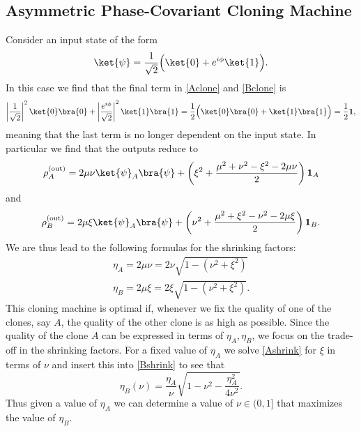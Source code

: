 \documentclass[reqno]{amsart}
\numberwithin{lemma}{section}
\numberwithin{proposition}{section}
\begin{document}
\subsection{Asymmetric Phase-Covariant Cloning Machine}
Consider an input state of the form
\begin{equation*}
    \ket{\psi} = \frac{1}{\sqrt{2}} \Big ( \ket{0} + e^{i\phi} \ket{1} \Big ).
\end{equation*}
In this case we find that the final term in \eqref{Aclone} and \eqref{Bclone} is 
\begin{align*}
    \left \vert \frac{1}{\sqrt{2}} \right \vert^{2} \ket{0} \bra{0} + \left \vert \frac{e^{i\phi}}{\sqrt{2}} \right \vert^{2} \ket{1} \bra{1} = \frac{1}{2} \Big ( \ket{0} \bra{0} + \ket{1} \bra{1} \Big ) = \frac{1}{2} \mathbf{1},
\end{align*}
meaning that the last term is no longer dependent on the input state. In particular we find that the outputs reduce to
\begin{equation}
\label{PCAclone}
    \rho_{A}^{\text{(out)}} = 2 \mu \nu \ket{\psi}_{A} \bra{\psi} + \left ( \xi^{2} + \frac{\mu^{2} + \nu^{2} - \xi^{2} - 2\mu \nu}{2} \right )  \mathbf{1}_{A} 
\end{equation}
and
\begin{equation}
\label{PCBclone}
    \rho_{B}^{\text{(out)}} = 2 \mu \xi \ket{\psi}_{A} \bra{\psi} + \left ( \nu^{2} + \frac{\mu^{2} + \xi^{2} - \nu^{2} - 2\mu \xi}{2} \right ) \mathbf{1}_{B}.
\end{equation}
We are thus lead to the following formulas for the shrinking factors:
\begin{align}
    \eta_{A} = 2 \mu \nu = 2\nu \sqrt{1 - (\nu^{2} + \xi^{2})} \label{Ashrink}\\
    \eta_{B} = 2 \mu \xi = 2 \xi \sqrt{1 - (\nu^{2} + \xi^{2})} \label{Bshrink}.
\end{align}
This cloning machine is optimal if, whenever we fix the quality of one of the clones, say $A$, the quality of the other clone is as high as possible. Since the quality of the clone $A$ can be expressed in terms of $\eta_{A}, \eta_{B}$, we focus on the trade-off in the shrinking factors. For a fixed value of $\eta_{A}$ we solve \eqref{Ashrink} for $\xi$ in terms of $\nu$ and insert this into \eqref{Bshrink} to see that
\begin{equation*}
    \eta_{B}(\nu) = \frac{\eta_{A}}{\nu} \sqrt{1 - \nu^{2} - \frac{\eta_{A}^{2}}{4 \nu^{2}}}.
\end{equation*}
Thus given a value of $\eta_{A}$ we can determine a value of $\nu \in (0,1]$ that maximizes the value of $\eta_{B}.$
{}
\end{document}
